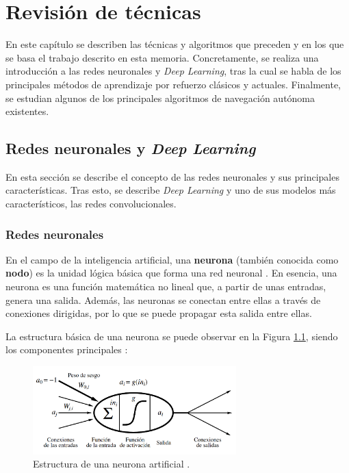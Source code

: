 \chapter{Revisión de técnicas}
En este capítulo se describen las técnicas y algoritmos que preceden y en los que se basa el trabajo descrito en esta memoria. Concretamente, se realiza una introducción a las redes neuronales y \textit{Deep Learning}, tras la cual se habla de los principales métodos de aprendizaje por refuerzo clásicos y actuales. Finalmente, se estudian algunos de los principales algoritmos de navegación autónoma existentes.

\section{Redes neuronales y \textit{Deep Learning}}

En esta sección se describe el concepto de las redes neuronales y sus principales características. Tras esto, se describe \textit{Deep Learning} y uno de sus modelos más característicos, las redes convolucionales.

\subsection{Redes neuronales}
En el campo de la inteligencia artificial, una \textbf{neurona} (también conocida como \textbf{nodo}) es la unidad lógica básica que forma una red neuronal \cite{alma991004256519704990}. En esencia, una neurona es una función matemática no lineal que, a partir de unas entradas, genera una salida. Además, las neuronas se conectan entre ellas a través de conexiones dirigidas, por lo que se puede propagar esta salida entre ellas.

La estructura básica de una neurona se puede observar en la Figura \ref{fig:chap3-neuron}, siendo los componentes principales \cite{alma991004256519704990}:

\begin{figure}[h]
    \centering
    \includegraphics[width=0.7\textwidth]{imagenes/cap3/neuron.png}
    \caption{Estructura de una neurona artificial \cite{alma991004256519704990}.}
    \label{fig:chap3-neuron}
\end{figure}

